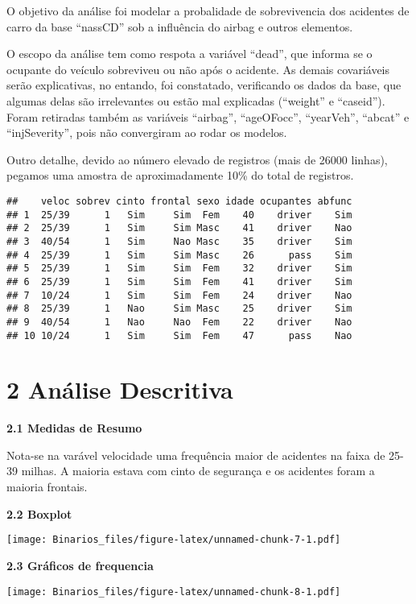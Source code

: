 \documentclass[
]{article}
\begin{document}
O objetivo da análise foi modelar a probalidade de sobrevivencia dos
acidentes de carro da base ``nassCD'' sob a influência do airbag e
outros elementos.

O escopo da análise tem como respota a variável ``dead'', que informa se
o ocupante do veículo sobreviveu ou não após o acidente. As demais
covariáveis serão explicativas, no entando, foi constatado, verificando
os dados da base, que algumas delas são irrelevantes ou estão mal
explicadas (``weight'' e ``caseid''). Foram retiradas também as
variáveis ``airbag'', ``ageOFocc'', ``yearVeh'', ``abcat'' e
``injSeverity'', pois não convergiram ao rodar os modelos.

Outro detalhe, devido ao número elevado de registros (mais de 26000
linhas), pegamos uma amostra de aproximadamente 10\% do total de
registros.

\begin{verbatim}
##    veloc sobrev cinto frontal sexo idade ocupantes abfunc
## 1  25/39      1   Sim     Sim  Fem    40    driver    Sim
## 2  25/39      1   Sim     Sim Masc    41    driver    Nao
## 3  40/54      1   Sim     Nao Masc    35    driver    Sim
## 4  25/39      1   Sim     Sim Masc    26      pass    Sim
## 5  25/39      1   Sim     Sim  Fem    32    driver    Sim
## 6  25/39      1   Sim     Sim  Fem    41    driver    Sim
## 7  10/24      1   Sim     Sim  Fem    24    driver    Nao
## 8  25/39      1   Nao     Sim Masc    25    driver    Sim
## 9  40/54      1   Nao     Nao  Fem    22    driver    Nao
## 10 10/24      1   Sim     Sim  Fem    47      pass    Nao
\end{verbatim}

\hypertarget{anuxe1lise-descritiva}{%
\section{2 Análise Descritiva}\label{anuxe1lise-descritiva}}

\textbf{2.1 Medidas de Resumo}

Nota-se na varável velocidade uma frequência maior de acidentes na faixa
de 25-39 milhas. A maioria estava com cinto de segurança e os acidentes
foram a maioria frontais.

\textbf{2.2 Boxplot}

\texttt{[image: Binarios\_files/figure-latex/unnamed-chunk-7-1.pdf]}

\textbf{2.3 Gráficos de frequencia}

\texttt{[image: Binarios\_files/figure-latex/unnamed-chunk-8-1.pdf]}
\end{document}
